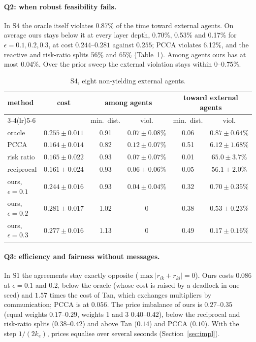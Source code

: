 \documentclass[11pt]{article}
\theoremstyle{definition}
\theoremstyle{remark}
\begin{document}
\paragraph{Q2: when robust feasibility fails.} In S4 the oracle itself violates 0.87\% of the time toward external agents. On average ours stays below it at every layer depth, 0.70\%, 0.53\% and 0.17\% for $\epsilon=0.1,0.2,0.3$, at cost $0.244$--$0.281$ against $0.255$; PCCA violates 6.12\%, and the reactive and risk-ratio splits 56\% and 65\% (Table~\ref{tab:s4}). Among agents ours has at most 0.04\%. Over the prior sweep the external violation stays within 0--0.75\%.

\begin{table}[h]
\centering\small
\begin{tabular}{lccccc}
\toprule
method & cost & \multicolumn{2}{c}{among agents} & \multicolumn{2}{c}{toward external agents}\\
\cmidrule(lr){3-4}\cmidrule(lr){5-6}
 & & min.\ dist. & viol. & min.\ dist. & viol.\\
\midrule
oracle & $0.255\pm0.011$ & 0.91 & $0.07\pm0.08\%$ & 0.06 & $0.87\pm0.64\%$\\
PCCA & $0.164\pm0.014$ & 0.82 & $0.12\pm0.07\%$ & 0.51 & $6.12\pm1.68\%$\\
risk ratio & $0.165\pm0.022$ & 0.93 & $0.07\pm0.07\%$ & 0.01 & $65.0\pm3.7\%$\\
reciprocal & $0.161\pm0.024$ & 0.93 & $0.06\pm0.06\%$ & 0.05 & $56.1\pm2.0\%$\\
ours, $\epsilon=0.1$ & $0.244\pm0.016$ & 0.93 & $0.04\pm0.04\%$ & 0.32 & $0.70\pm0.35\%$\\
ours, $\epsilon=0.2$ & $0.281\pm0.017$ & 1.02 & 0 & 0.38 & $0.53\pm0.23\%$\\
ours, $\epsilon=0.3$ & $0.277\pm0.016$ & 1.13 & 0 & 0.49 & $0.17\pm0.16\%$\\
\bottomrule
\end{tabular}
\caption{S4, eight non-yielding external agents.}
\label{tab:s4}
\end{table}

\paragraph{Q3: efficiency and fairness without messages.} In S1 the agreements stay exactly opposite ($\max|r_{ik}+r_{ki}|=0$). Ours costs $0.086$ at $\epsilon=0.1$ and $0.2$, below the oracle (whose cost is raised by a deadlock in one seed) and $1.57$ times the cost of Tan, which exchanges multipliers by communication; PCCA is at $0.056$. The price imbalance of ours is $0.27$--$0.35$ (equal weights $0.17$--$0.29$, weights 1 and 3 $0.40$--$0.42$), below the reciprocal and risk-ratio splits ($0.38$--$0.42$) and above Tan ($0.14$) and PCCA ($0.10$). With the step $1/(2k_e)$, prices equalise over several seconds (Section~\ref{sec:impl}).
\end{document}
